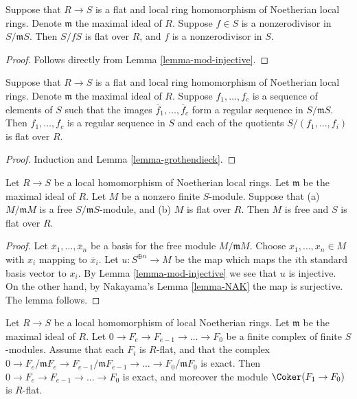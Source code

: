 \begin{lemma}
\label{lemma-grothendieck}
Suppose that $R \to S$ is a flat and local ring homomorphism of Noetherian
local rings. Denote $\mathfrak m$ the maximal ideal of $R$.
Suppose $f \in S$ is a nonzerodivisor in $S/{\mathfrak m}S$.
Then $S/fS$ is flat over $R$, and $f$ is a nonzerodivisor in $S$.
\end{lemma}

\begin{proof}
Follows directly from Lemma \ref{lemma-mod-injective}.
\end{proof}

\begin{lemma}
\label{lemma-grothendieck-regular-sequence}
Suppose that $R \to S$ is a flat and local ring homomorphism of Noetherian
local rings. Denote $\mathfrak m$ the maximal ideal of $R$.
Suppose $f_1, \ldots, f_c$ is a sequence of elements of
$S$ such that the images $\overline{f}_1, \ldots, \overline{f}_c$
form a regular sequence in $S/{\mathfrak m}S$.
Then $f_1, \ldots, f_c$ is a regular sequence in $S$ and each
of the quotients $S/(f_1, \ldots, f_i)$ is flat over $R$.
\end{lemma}

\begin{proof}
Induction and Lemma \ref{lemma-grothendieck}.
\end{proof}

\begin{lemma}
\label{lemma-free-fibre-flat-free}
Let $R \to S$ be a local homomorphism of Noetherian
local rings. Let $\mathfrak m$ be the maximal
ideal of $R$. Let $M$ be a nonzero finite $S$-module.
Suppose that (a) $M/\mathfrak mM$
is a free $S/\mathfrak mS$-module, and (b) $M$ is flat over $R$.
Then $M$ is free and $S$ is flat over $R$.
\end{lemma}

\begin{proof}
Let $\overline{x}_1, \ldots, \overline{x}_n$ be a basis
for the free module $M/\mathfrak mM$. Choose
$x_1, \ldots, x_n \in M$ with $x_i$ mapping to $\overline{x}_i$. Let
$u : S^{\oplus n} \to M$ be the map which maps the $i$th
standard basis vector to $x_i$. By Lemma \ref{lemma-mod-injective}
we see that $u$ is injective. On the other hand, by
Nakayama's Lemma \ref{lemma-NAK} the map is surjective. The
lemma follows.
\end{proof}

\begin{lemma}
\label{lemma-complex-exact-mod}
Let $R \to S$ be a local homomorphism of local Noetherian
rings. Let $\mathfrak m$ be the maximal ideal of $R$.
Let $0 \to F_e \to F_{e-1} \to \ldots \to F_0$
be a finite complex of finite $S$-modules. Assume that
each $F_i$ is $R$-flat, and that the complex
$0 \to F_e/\mathfrak m F_e \to F_{e-1}/\mathfrak m F_{e-1}
\to \ldots \to F_0 / \mathfrak m F_0$ is exact.
Then $0 \to F_e \to F_{e-1} \to \ldots \to F_0$
is exact, and moreover the module
$\Coker(F_1 \to F_0)$ is $R$-flat.
\end{lemma}


